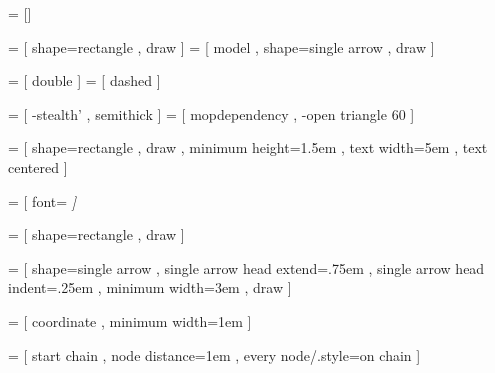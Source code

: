
\usetikzlibrary{positioning,chains,fit,calc,arrows,decorations.pathmorphing}
\usetikzlibrary{shapes.arrows,shapes.geometric,shapes.symbols}




 = []

  = [ shape=rectangle
    , draw
    ]
  = [ model
    , shape=single arrow
    , draw
    ]

 = [ double ]
 = [ dashed ]

  = [ -stealth'
    , semithick
    ]
  = [ mopdependency
    , -open triangle 60
    ]

%
%
\newcommand{\bendArrow}[3]{
  let \p{content size} = ($(#1.north east) - (#1.south west)$) in
  let \n{tip length 1} = {veclen(0.5 * \y{content size}, 0.5 * \y{content size})} in
  let \n{tip length 2} = {veclen(#2,#2)} in

  (#1.north east)
  -- ++ (315 : \n{tip length 1})
  -- ++ (225 : \n{tip length 1} + \n{tip length 2})
  -- ++ (0, #2)
  -- (#1.south west)
  arc (270 : 180 : \y{content size} + #3)
  -- ++ (\y{content size}, 0)
  arc (180 : 270 : #3)
  (#1.north east)
  -- ++ (135 : \n{tip length 2})
  -- ++ (0, -#2)
  -- (#1.north west)}



  = [ shape=rectangle
    , draw
    , minimum height=1.5em
    , text width=5em
    , text centered
    ]

  = [ font=\scriptsize\it
    ]

  = [ shape=rectangle
    , draw
    ]

  = [ shape=single arrow
    , single arrow head extend=.75em
    , single arrow head indent=.25em
    , minimum width=3em
    , draw
    ]

  = [ coordinate
    , minimum width=1em
    ]

  = [ start chain
    , node distance=1em
    , every node/.style={on chain}
    ]

